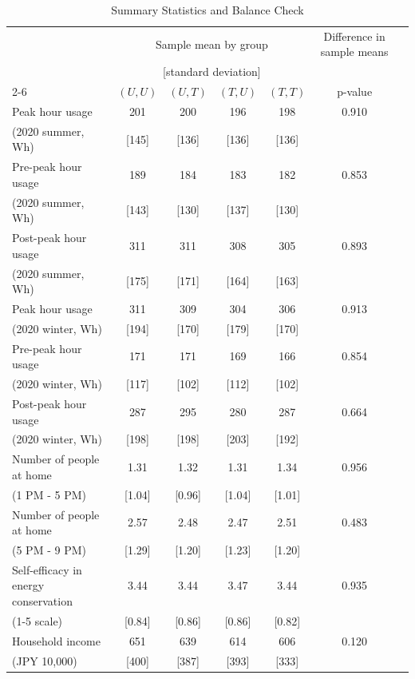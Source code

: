 \begin{table}[H]
\caption{Summary Statistics and Balance Check}
\label{tab:balance_check}
\centering
\begin{threeparttable}

{\normalsize

\begin{tabular*}{\textwidth}{l @{\extracolsep{\fill}} cccccc}
\toprule
 & \multicolumn{4}{c}{Sample mean by group } &   \multicolumn{1}{c}{Difference in sample means}\\
 &  \multicolumn{4}{c}{[standard deviation]} &  \\
\cmidrule{2-6}
 & $(U, U)$ & $(U, T)$ & $(T, U)$ & $(T, T)$ & p-value \\
\midrule
Peak hour usage & 201 & 200 & 196 & 198 & 0.910 \\
 (2020 summer, Wh) & [145] & [136] & [136] & [136] & \\
\addlinespace
Pre-peak hour usage & 189 & 184 & 183 & 182 & 0.853 \\
 (2020 summer, Wh) & [143] & [130] & [137] & [130] & \\
\addlinespace
Post-peak hour usage & 311 & 311 & 308 & 305 & 0.893 \\
 (2020 summer, Wh) & [175] & [171] & [164] & [163] & \\
\addlinespace
Peak hour usage & 311 & 309 & 304 & 306 & 0.913 \\
 (2020 winter, Wh) & [194] & [170] & [179] & [170] & \\
\addlinespace
Pre-peak hour usage & 171 & 171 & 169 & 166 & 0.854 \\
 (2020 winter, Wh) & [117] & [102] & [112] & [102] & \\
\addlinespace
Post-peak hour usage & 287 & 295 & 280 & 287 & 0.664 \\
 (2020 winter, Wh) & [198] & [198] & [203] & [192] & \\
\addlinespace
Number of people at home & 1.31 & 1.32 & 1.31 & 1.34 & 0.956 \\
(1 PM - 5 PM) & [1.04] & [0.96] & [1.04] & [1.01] & \\
\addlinespace
Number of people at home & 2.57 & 2.48 & 2.47 & 2.51 & 0.483 \\
(5 PM - 9 PM) & [1.29] & [1.20] & [1.23] & [1.20] & \\
\addlinespace
Self-efficacy in energy conservation & 3.44 & 3.44 & 3.47 & 3.44 & 0.935 \\
 (1-5 scale) & [0.84] & [0.86] & [0.86] & [0.82] & \\
\addlinespace
Household income & 651 & 639 & 614 & 606 & 0.120 \\
(JPY 10,000) & [400] & [387] & [393] & [333] & \\
\bottomrule
\end{tabular*}
}


\end{threeparttable}
\end{table}

